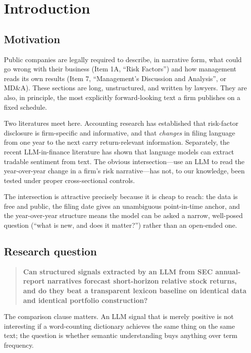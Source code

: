 \documentclass[11pt]{article}
\begin{document}
\section{Introduction}

\subsection{Motivation}

Public companies are legally required to describe, in narrative form, what could go wrong
with their business (Item 1A, ``Risk Factors'') and how management reads its own results
(Item 7, ``Management's Discussion and Analysis'', or MD\&A). These sections are long,
unstructured, and written by lawyers. They are also, in principle, the most explicitly
forward-looking text a firm publishes on a fixed schedule.

Two literatures meet here. Accounting research has established that risk-factor
disclosure is firm-specific and informative, and that \emph{changes} in filing language
from one year to the next carry return-relevant information. Separately, the recent
LLM-in-finance literature has shown that language models can extract tradable sentiment
from text. The obvious intersection---use an LLM to read the year-over-year change in a
firm's risk narrative---has not, to our knowledge, been tested under proper
cross-sectional controls.

The intersection is attractive precisely because it is cheap to reach: the data is free
and public, the filing date gives an unambiguous point-in-time anchor, and the
year-over-year structure means the model can be asked a narrow, well-posed question
(``what is new, and does it matter?'') rather than an open-ended one.

\subsection{Research question}

\begin{quote}
\textbf{Can structured signals extracted by an LLM from SEC annual-report narratives
forecast short-horizon relative stock returns, and do they beat a transparent lexicon
baseline on identical data and identical portfolio construction?}
\end{quote}

The comparison clause matters. An LLM signal that is merely positive is not interesting
if a word-counting dictionary achieves the same thing on the same text; the question is
whether semantic understanding buys anything over term frequency.
\end{document}
